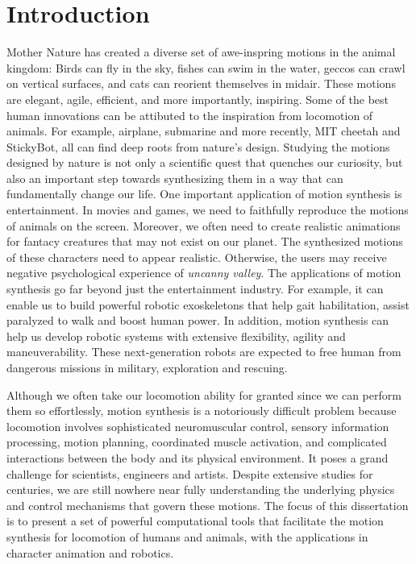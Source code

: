 \chapter{Introduction}

Mother Nature has created a diverse set of awe-inspring motions in the animal kingdom: Birds can fly in the sky, fishes can swim in the water, geccos can crawl on vertical surfaces, and cats can reorient themselves in midair. These motions are elegant, agile, efficient, and more importantly, inspiring. Some of the best human innovations can be attibuted to the inspiration from locomotion of animals. For example, airplane, submarine and more recently, MIT cheetah and StickyBot, all can find deep roots from nature's design. Studying the motions designed by nature is not only a scientific quest that quenches our curiosity, but also an important step towards synthesizing them in a way that can fundamentally change our life. One important application of motion synthesis is entertainment. In movies and games, we need to faithfully reproduce the motions of animals on the screen. Moreover, we often need to create realistic animations for fantacy creatures that may not exist on our planet. The synthesized motions of these characters need to appear realistic. Otherwise, the users may receive negative psychological experience of \emph{uncanny valley}. The applications of motion synthesis go far beyond just the entertainment industry. For example, it can enable us to build powerful robotic exoskeletons that help gait habilitation, assist paralyzed to walk and boost human power. In addition, motion synthesis can help us develop robotic systems with extensive flexibility, agility and maneuverability. These next-generation robots are expected to free human from dangerous missions in military, exploration and rescuing. 

Although we often take our locomotion ability for granted since we can perform them so effortlessly, motion synthesis is a notoriously difficult problem because locomotion involves sophisticated neuromuscular control, sensory information processing, motion planning, coordinated muscle activation, and complicated interactions between the body and its physical environment. It poses a grand challenge for scientists, engineers and artists. Despite extensive studies for centuries, we are still nowhere near fully understanding the underlying physics and control mechanisms that govern these motions. The focus of this dissertation is to present a set of powerful computational tools that facilitate the motion synthesis for locomotion of humans and animals, with the applications in character animation and robotics.

